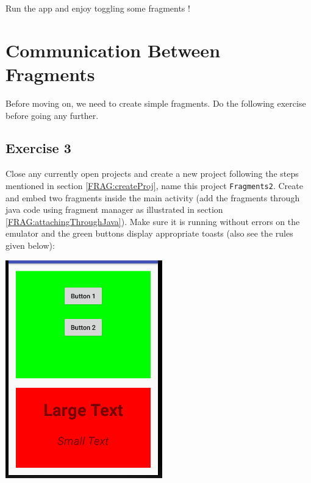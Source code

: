 Run the app and enjoy toggling some fragments !

\section{Communication Between Fragments}

Before moving on, we need to create simple fragments. Do the following exercise before going any further.

\subsection{Exercise 3}
Close any currently open projects and create a new project following the steps mentioned in section \ref{FRAG:createProj}, name this project \texttt{Fragments2}. Create and embed two fragments inside the main activity (add the fragments through java code using fragment manager as illustrated in section \ref{FRAG:attachingThroughJava}). Make sure it is running without errors on the emulator and the green buttons display appropriate toasts (also see the rules given below):

\begin{center}
	\includegraphics[scale=\FigureScale]{chapters/ch11/images/23}
\end{center}

